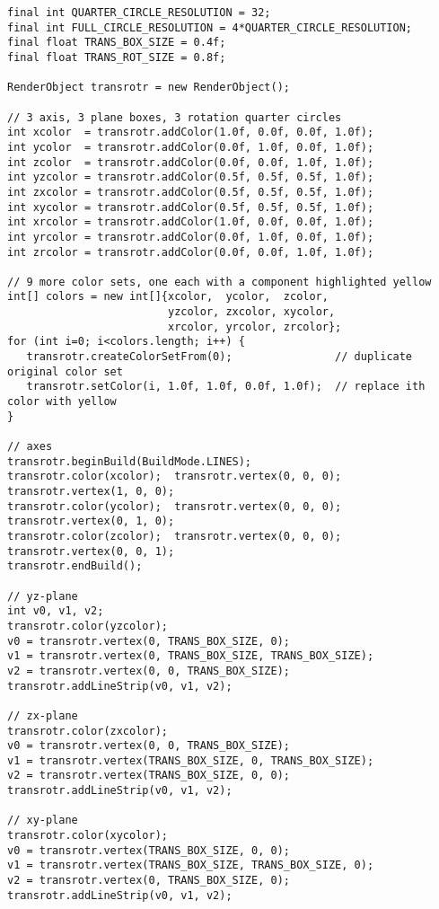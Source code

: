 \documentclass{article}
\begin{document}
\begin{lstlisting}[caption={3D Transform dragger with multiple color sets},label=lst:dragger:multicolor]
final int QUARTER_CIRCLE_RESOLUTION = 32;
final int FULL_CIRCLE_RESOLUTION = 4*QUARTER_CIRCLE_RESOLUTION;
final float TRANS_BOX_SIZE = 0.4f;
final float TRANS_ROT_SIZE = 0.8f;
      
RenderObject transrotr = new RenderObject();
      
// 3 axis, 3 plane boxes, 3 rotation quarter circles
int xcolor  = transrotr.addColor(1.0f, 0.0f, 0.0f, 1.0f);
int ycolor  = transrotr.addColor(0.0f, 1.0f, 0.0f, 1.0f);
int zcolor  = transrotr.addColor(0.0f, 0.0f, 1.0f, 1.0f);
int yzcolor = transrotr.addColor(0.5f, 0.5f, 0.5f, 1.0f);
int zxcolor = transrotr.addColor(0.5f, 0.5f, 0.5f, 1.0f);
int xycolor = transrotr.addColor(0.5f, 0.5f, 0.5f, 1.0f);
int xrcolor = transrotr.addColor(1.0f, 0.0f, 0.0f, 1.0f);
int yrcolor = transrotr.addColor(0.0f, 1.0f, 0.0f, 1.0f);
int zrcolor = transrotr.addColor(0.0f, 0.0f, 1.0f, 1.0f);
      
// 9 more color sets, one each with a component highlighted yellow
int[] colors = new int[]{xcolor,  ycolor,  zcolor,
                         yzcolor, zxcolor, xycolor,
                         xrcolor, yrcolor, zrcolor};
for (int i=0; i<colors.length; i++) {
   transrotr.createColorSetFrom(0);                // duplicate original color set
   transrotr.setColor(i, 1.0f, 1.0f, 0.0f, 1.0f);  // replace ith color with yellow
}
      
// axes
transrotr.beginBuild(BuildMode.LINES);
transrotr.color(xcolor);  transrotr.vertex(0, 0, 0);  transrotr.vertex(1, 0, 0);
transrotr.color(ycolor);  transrotr.vertex(0, 0, 0);  transrotr.vertex(0, 1, 0);
transrotr.color(zcolor);  transrotr.vertex(0, 0, 0);  transrotr.vertex(0, 0, 1);
transrotr.endBuild();
      
// yz-plane
int v0, v1, v2;
transrotr.color(yzcolor);
v0 = transrotr.vertex(0, TRANS_BOX_SIZE, 0);
v1 = transrotr.vertex(0, TRANS_BOX_SIZE, TRANS_BOX_SIZE);
v2 = transrotr.vertex(0, 0, TRANS_BOX_SIZE);
transrotr.addLineStrip(v0, v1, v2);

// zx-plane
transrotr.color(zxcolor);
v0 = transrotr.vertex(0, 0, TRANS_BOX_SIZE);
v1 = transrotr.vertex(TRANS_BOX_SIZE, 0, TRANS_BOX_SIZE);
v2 = transrotr.vertex(TRANS_BOX_SIZE, 0, 0);
transrotr.addLineStrip(v0, v1, v2);
      
// xy-plane
transrotr.color(xycolor);
v0 = transrotr.vertex(TRANS_BOX_SIZE, 0, 0);
v1 = transrotr.vertex(TRANS_BOX_SIZE, TRANS_BOX_SIZE, 0);
v2 = transrotr.vertex(0, TRANS_BOX_SIZE, 0);
transrotr.addLineStrip(v0, v1, v2);
      

\end{lstlisting}
\end{document}
